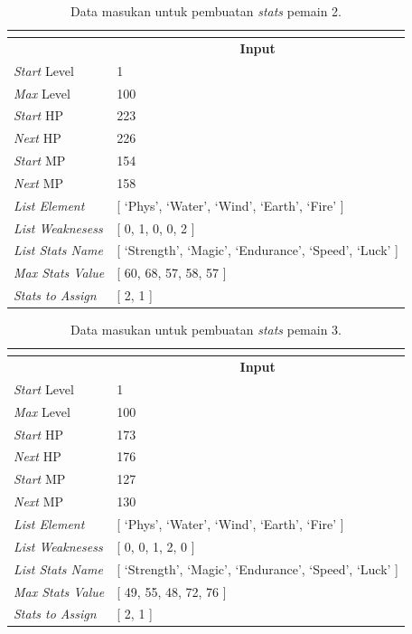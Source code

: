 \begin{longtable}{|l|l|}
	\caption{Data masukan untuk pembuatan \textit{stats} pemain 2.}
	\vspace{1ex}
	\label{tb:player_input_variable_eval_2}\\
	\hline
	\rowcolor[HTML]{9B9B9B} 
	\multicolumn{1}{|c|}{\cellcolor[HTML]{9B9B9B}\textbf{Variabel}} & \multicolumn{1}{c|}{\cellcolor[HTML]{9B9B9B}\textbf{Input}} \\ \hline
	\textit{Start} Level & 1 \\ \hline
	\textit{Max} Level & 100 \\ \hline
	\textit{Start} HP & 223 \\ \hline
	\textit{Next} HP & 226 \\ \hline
	\textit{Start} MP & 154 \\ \hline
	\textit{Next} MP & 158 \\ \hline
	\textit{List Element} & {[} `Phys', `Water', `Wind', `Earth', `Fire' {]} \\ \hline
	\textit{List Weaknesess} & {[} 0, 1, 0, 0, 2 {]} \\ \hline
	\textit{List Stats Name} & {[} `Strength', `Magic', `Endurance', `Speed', `Luck' {]} \\ \hline
	\textit{Max Stats Value} & {[} 60, 68, 57, 58, 57 {]} \\ \hline
	\textit{Stats to Assign} & {[} 2, 1 {]} \\ \hline
\end{longtable}
\vspace{-1ex}


\begin{longtable}{|l|l|}
	\caption{Data masukan untuk pembuatan \textit{stats} pemain 3.}
	\vspace{1ex}
	\label{tb:player_input_variable_eval_3}\\
	\hline
	\rowcolor[HTML]{9B9B9B} 
	\multicolumn{1}{|c|}{\cellcolor[HTML]{9B9B9B}\textbf{Variabel}} & \multicolumn{1}{c|}{\cellcolor[HTML]{9B9B9B}\textbf{Input}} \\ \hline
	\textit{Start} Level & 1 \\ \hline
	\textit{Max} Level & 100 \\ \hline
	\textit{Start} HP & 173 \\ \hline
	\textit{Next} HP & 176 \\ \hline
	\textit{Start} MP & 127 \\ \hline
	\textit{Next} MP & 130 \\ \hline
	\textit{List Element} & {[} `Phys', `Water', `Wind', `Earth', `Fire' {]} \\ \hline
	\textit{List Weaknesess} & {[} 0, 0, 1, 2, 0 {]} \\ \hline
	\textit{List Stats Name} & {[} `Strength', `Magic', `Endurance', `Speed', `Luck' {]} \\ \hline
	\textit{Max Stats Value} & {[} 49, 55, 48, 72, 76 {]} \\ \hline
	\textit{Stats to Assign} & {[} 2, 1 {]} \\ \hline
\end{longtable}
\vspace{-1ex}


